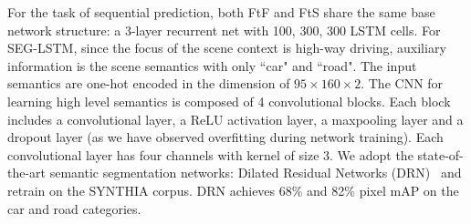 \documentclass[10pt,twocolumn,letterpaper]{article}
\begin{document}
For the task of sequential prediction, both FtF and FtS share the same base network structure:
a 3-layer recurrent net with 100, 300, 300 LSTM cells.
For SEG-LSTM, since the focus of the scene context is high-way driving, auxiliary information is the scene semantics with only ``car" and ``road". The input semantics are one-hot encoded in the dimension of $95\times160\times2$. The CNN for learning high level semantics is composed of 4 convolutional blocks. Each block includes a convolutional layer, a ReLU activation layer, a maxpooling layer and a dropout layer (as we have observed overfitting during network training). Each convolutional layer has four channels with kernel of size 3.
We adopt the state-of-the-art semantic segmentation networks: Dilated Residual Networks (DRN)~\cite{yu2017dilated} and retrain on the SYNTHIA corpus. DRN achieves 68\% and 82\% pixel mAP on the car and road categories.


\end{document}
